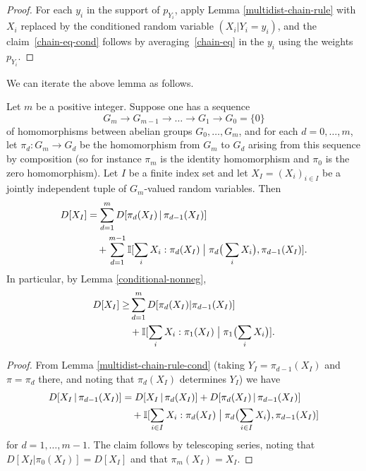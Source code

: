   \begin{proof}
  For each $y_i$ in the support of $p_{Y_i}$, apply Lemma \ref{multidist-chain-rule} with $X_i$ replaced by the conditioned random variable $(X_i|Y_i=y_i)$, and the claim~\eqref{chain-eq-cond} follows by averaging~\eqref{chain-eq} in the $y_i$ using the weights $p_{Y_i}$.
  \end{proof}

  We can iterate the above lemma as follows.

  \begin{lemma}\label{multidist-chain-rule-iter}  Let $m$ be a positive integer.
    Suppose one has a sequence
    \begin{equation}\label{g-seq}
      G_m \to G_{m-1} \to \dots \to G_1 \to G_0 = \{0\}
    \end{equation}
    of homomorphisms between abelian groups $G_0,\dots,G_m$, and for each $d=0,\dots,m$, let $\pi_d : G_m \to G_d$ be the homomorphism from $G_m$ to $G_d$ arising from this sequence by composition (so for instance $\pi_m$ is the identity homomorphism and $\pi_0$ is the zero homomorphism).
    Let $I$ be a finite index set and let $X_{I} = (X_i)_{i \in I}$ be a jointly independent tuple of $G_m$-valued random variables.
    Then
    \begin{equation}
      \begin{split}
        D[ X_{I} ] &=  \sum_{d=1}^m D[ \pi_d(X_{I}) \,|\, \pi_{d-1}(X_{I})] \\
         &\quad + \sum_{d=1}^{m-1} \mathbb{I}[ \sum_i X_i : \pi_d(X_{I}) \; \big| \; \pi_d\big(\sum_i X_i\big), \pi_{d-1}(X_{I}) ].
      \end{split}\label{chain-eq-cond'}
    \end{equation}
    In particular, by Lemma \ref{conditional-nonneg},
    \begin{align}\nonumber
        D[ X_{I} ] \geq  & \sum_{d=1}^m D[ \pi_d(X_{I})|\pi_{d-1}(X_{I}) ] \\
         & + \mathbb{I}[ \sum_i X_i : \pi_1(X_{I}) \; \big| \; \pi_1\bigl(\sum_i X_i\bigr) ].\label{chain-eq-cond''}
    \end{align}
  \end{lemma}

  \begin{proof}
  From Lemma \ref{multidist-chain-rule-cond} (taking $Y_I = \pi_{d-1}(X_I)$ and $\pi = \pi_d$ there, and noting that $\pi_d(X_I)$ determines $Y_I$) we have
  \begin{align*}
    D[ X_{I} \,|\, \pi_{d-1}(X_{I}) ] &=  D[ X_{I} \,|\, \pi_d(X_{I}) ] + D[  \pi_d(X_{I})\,|\,\pi_{d-1}(X_{I}) ] \\
                                             &\quad + \mathbb{I}[ \sum_{i \in I} X_i : \pi_d(X_{I}) \; \big| \; \pi_d\bigl(\sum_{i \in I} X_i\bigr), \pi_{d-1}(X_{I}) ]
  \end{align*}
  for $d=1,\dots,m-1$. The claim follows by telescoping series, noting that $D[X_I | \pi_0(X_I)] = D[X_I]$ and that $\pi_m(X_I)=X_I$.
  \end{proof}


